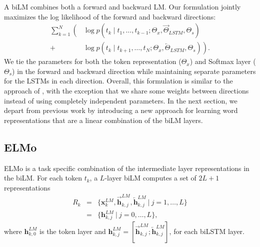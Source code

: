 \documentclass[11pt,a4paper]{article}
\newcommand{\ELMO}{ELMo}
\begin{document}
A biLM combines both a forward and backward LM.  Our formulation jointly maximizes the log likelihood of the forward and backward directions:
\[
\begin{split}
\sum_{k=1}^N \left( \right. & \log p({t_k} \mid t_1, \ldots, t_{k-1}; \Theta_x, \overrightarrow{\Theta}_{LSTM}, \Theta_s) \\
+  & \log p({t_k} \mid t_{k+1}, \ldots, t_{N}; \Theta_x, \overleftarrow{\Theta}_{LSTM}, \Theta_s)
\left. \right).
\end{split}
\]
We tie the parameters for both the token representation ($\Theta_x$) and Softmax layer ($\Theta_s$) in the forward and backward
direction while maintaining separate parameters for the LSTMs in each direction.  Overall, this formulation is similar to the approach
of \citet{Peters2017SemisupervisedST}, with the exception that we share some weights between directions instead of using completely independent parameters. In the next section, we depart from previous work by introducing a new approach for learning word representations that are a linear combination of the biLM layers.

\subsection{\ELMO{}}
\label{sec:compute_elmo}
\ELMO{} is a task specific combination of the intermediate layer representations in the biLM.
For each token $t_k$, a $L$-layer biLM computes a set of $2L + 1$ representations
\begin{eqnarray*}
R_k & =&  \{\mathbf{x}^{LM}_{k}, \overrightarrow{\mathbf{h}}^{LM}_{k,j}, \overleftarrow{\mathbf{h}}^{LM}_{k,j} \ |\  j =1, \ldots, L \} \\
 & = & \{\mathbf{h}^{LM}_{k,j}\ | \ j=0, \ldots, L\},
\end{eqnarray*}
where $\mathbf{h}^{LM}_{k,0}$ is the token layer and $\mathbf{h}^{LM}_{k,j} = [\overrightarrow{\mathbf{h}}^{LM}_{k,j}; \overleftarrow{\mathbf{h}}^{LM}_{k,j}]$, for each biLSTM layer.
\end{document}

